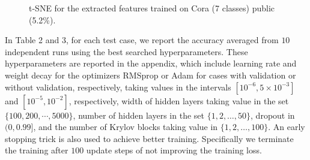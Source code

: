 \documentclass{article}
\begin{document}
\begin{figure}[htbp]
\centering
{}
\hfill
{}
\hfill
{}
\caption{t-SNE for the extracted features trained on Cora (7 classes) public (5.2\%).}
\label{fig:tsne}
\end{figure}

In Table 2 and 3, for each test case, we report the accuracy averaged from $10$ independent runs using the best searched hyperparameters. These hyperparameters are reported in the appendix, which include learning rate and weight decay for the optimizers RMSprop or Adam for cases with validation or without validation, respectively, taking values in the intervals $[{10}^{-6}, 5\times{10}^{-3}]$ and $[{10}^{-5}, {10}^{-2}]$, respectively, width of hidden layers taking value in the set $\{100, 200, \cdots, 5000\}$, number of hidden layers in the set $\{1, 2, \dots, 50\}$, dropout in $(0, 0.99]$, and the number of Krylov blocks taking value in $\{1, 2, \dots, 100\}$. An early stopping trick is also used to achieve better training.
Specifically we terminate the training after $100$ update steps of not improving the training loss.
\end{document}
